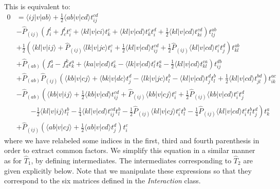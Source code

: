 This is equivalent to:
\begin{align}
0&=\langle ij|v|ab\rangle+\frac{1}{2}\langle ab|v|cd\rangle t_{ij}^{cd}\nonumber\\
&-\hat{P}_{(ij)}\left(f_i^l + f_c^lt_i^c + \langle kl|v|ci\rangle t_k^c + \langle kl|v|cd\rangle t_k^ct_i^d+\frac{1}{2}\langle kl|v|cd\rangle t_{ki}^{cd}\right)t_{lj}^{ab}\nonumber\\
&+\frac{1}{2}\left(\langle kl|v|ij\rangle +\hat{P}_{(ij)}\langle lk|v|jc\rangle t_i^c+\frac{1}{2}\langle kl|v|cd\rangle t_{ij}^{cd}+\frac{1}{2}\hat{P}_{(ij)}\langle kl|v|cd\rangle t_i^ct_j^d\right)t_{kl}^{ab}\nonumber\\
&+\hat{P}_{(ab)}\left(f_d^a-f_d^kt_k^a+\langle ka|v|cd\rangle t_k^c-\langle lk|v|cd\rangle t_l^ct_k^a-\frac{1}{2}\langle kl|v|cd\rangle t_{kl}^{ca}\right)t_{ij}^{db}\nonumber\\
&+\hat{P}_{(ab)}\hat{P}_{(ij)}\left(\langle kb|v|cj\rangle + \langle bk|v|dc\rangle t_j^d-\langle lk|v|jc\rangle t_l^b-\langle kl|v|cd\rangle t_j^dt_l^b+\frac{1}{2}\langle kl|v|cd\rangle t_{jl}^{bd}\right)t_{ik}^{ac}\nonumber\\
&-\hat{P}_{(ab)}\left(\langle kb|v|ij\rangle +\frac{1}{2}\langle kb|v|cd\rangle t_{ij}^{cd}+\hat{P}_{(ij)}\langle kb|v|cj\rangle t_i^c+\frac{1}{2}\hat{P}_{(ij)}\langle kb|v|cd\rangle t_i^ct_j^d\right.\nonumber\\
&\phantom{++}\left.-\frac{1}{2}\langle kl|v|ij\rangle t_l^b-\frac{1}{4}\langle kl|v|cd\rangle t_{ij}^{cd}t_l^b-\frac{1}{2}\hat{P}_{(ij)}\langle kl|v|cj\rangle t_i^ct_l^b-\frac{1}{4}\hat{P}_{(ij)}\langle kl|v|cd\rangle t_i^ct_l^bt_j^d\right)t_k^a\nonumber\\
&+\hat{P}_{(ij)}\left(\langle ab|v|cj\rangle +\frac{1}{2}\langle ab|v|cd\rangle t_j^d\right)t_i^c
\label{eq:impl:t2amplitude2}
\end{align}
where we have relabeled some indices in the first, third and fourth parenthesis in order to extract common factors. We simplify this equation in a similar manner as for $\hat{T}_1$, by defining intermediates. The intermediates corresponding to $\hat{T}_2$ are given explicitly below. Note that we manipulate these expressions so that they correspond to the six matrices defined in the \emph{Interaction} class.

